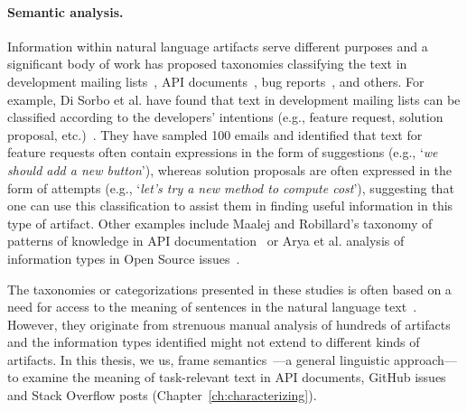 \paragraph{\textbf{Semantic analysis.}} Information within natural language artifacts 
serve different purposes and a significant body of work has 
 proposed taxonomies classifying the text in 
 development mailing lists~\cite{Sorbo2015, huang2018automating},
API documents~\cite{Maalej2013}, bug reports~\cite{Arya2019}, and others.
For example, Di Sorbo et al. have found that 
text in development mailing lists can be classified according to the developers' intentions (e.g., feature request, solution proposal, etc.)~\cite{Sorbo2015}.
They have sampled 100 emails and identified that text for feature requests 
often contain expressions in the form of suggestions
(e.g., `\textit{we should add a new button}'), whereas solution proposals 
are often expressed in the form of attempts (e.g., `\textit{let's try a new method to compute cost}'),
suggesting that one can use this classification to assist them in finding useful information
in this type of artifact.
Other examples include Maalej and Robillard's taxonomy of patterns of knowledge in API documentation~\cite{Maalej2013}
or Arya et al. analysis of information types in Open Source issues~\cite{Arya2019}.



The taxonomies or categorizations presented in these studies is often based
on a need for access to the meaning of
sentences in the natural language text~\cite{berners2001, calero2006, witte2007}.
However, they originate from strenuous manual analysis 
of hundreds of artifacts and the information types identified 
might not extend to different kinds of artifacts.
In this thesis, 
we us, frame semantics~\cite{fillmore1976frame}---a general linguistic approach---to
examine the meaning of task-relevant text in 
API documents, GitHub issues and Stack Overflow posts (Chapter~\ref{ch:characterizing}).
















